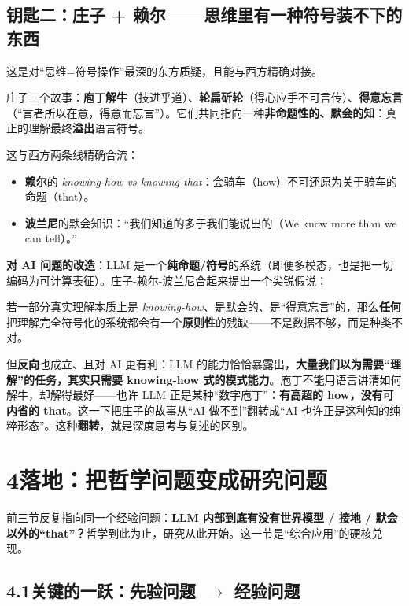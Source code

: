 \documentclass[12pt,a4paper,fontset=none]{ctexart}
\newcommand{\keyq}[1]{{\hei\bfseries\color{accent}#1}}
\begin{document}
\subsection*{\hei\color{ink}钥匙二：庄子 + 赖尔——思维里有一种符号装不下的东西}

这是对“思维=符号操作”最深的东方质疑，且能与西方精确对接。

庄子三个故事：\textbf{庖丁解牛}（技进乎道）、\textbf{轮扁斫轮}（得心应手不可言传）、\textbf{得意忘言}（“言者所以在意，得意而忘言”）。它们共同指向一种\textbf{非命题性的、默会的知}：真正的理解最终\textbf{溢出}语言符号。

这与西方两条线精确合流：
\begin{itemize}[leftmargin=2.2em,itemsep=0.2em]
\item \textbf{赖尔}的 \textit{knowing-how vs knowing-that}：会骑车（how）不可还原为关于骑车的命题（that）。
\item \textbf{波兰尼}的默会知识：“我们知道的多于我们能说出的（We know more than we can tell）。”
\end{itemize}

\textbf{对 AI 问题的改造}：LLM 是一个\textbf{纯命题/符号}的系统（即便多模态，也是把一切编码为可计算表征）。庄子-赖尔-波兰尼合起来提出一个尖锐假说：

\begin{mainline}
若一部分真实理解本质上是 \textit{knowing-how}、是默会的、是“得意忘言”的，那么\textbf{任何}把理解完全符号化的系统都会有一个\textbf{原则性}的残缺——不是数据不够，而是种类不对。
\end{mainline}

但\textbf{反向}也成立、且对 AI 更有利：LLM 的能力恰恰暴露出，\textbf{大量我们以为需要“理解”的任务，其实只需要 knowing-how 式的模式能力}。庖丁不能用语言讲清如何解牛，却解得最好——也许 LLM 正是某种“数字庖丁”：\textbf{有高超的 how，没有可内省的 that}。这一下把庄子的故事从“AI 做不到”翻转成“AI 也许正是这种知的纯粹形态”。这种\textbf{翻转}，就是深度思考与复述的区别。

\section*{4\quad 落地：把哲学问题变成研究问题}

前三节反复指向同一个经验问题：\keyq{LLM 内部到底有没有世界模型 / 接地 / 默会以外的“that”？}哲学到此为止，研究从此开始。这一节是“综合应用”的硬核兑现。

\subsection*{\hei\color{ink}4.1\quad 关键的一跃：先验问题 \(\rightarrow\) 经验问题}
\end{document}
